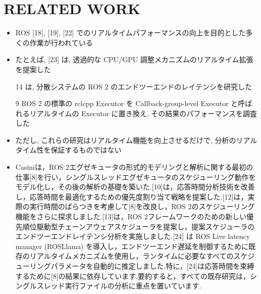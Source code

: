 
\section{RELATED WORK}
\label{sec: related work}


\begin{frame}{}
    \begin{itemize}
        \item ROS [18], [19], [22] でのリアルタイムパフォーマンスの向上を目的とした多くの作業が行われている
\item たとえば, [23] は, 透過的な CPU/GPU 調整メカニズムのリアルタイム拡張を提案した
\item [14] は, 分散システムの ROS 2 のエンドツーエンドのレイテンシを研究した
\item [9] ROS 2 の標準の rclcpp Executor を Callback-group-level Executor と呼ばれるリアルタイムの Executor に置き換え, その結果のパフォーマンスを調査した
\item ただし, これらの研究はリアルタイム機能を向上させるだけで, 分析のリアルタイム性を保証するものではない
    \end{itemize}
\end{frame}

\begin{frame}{}
    \begin{itemize}
        \item Casiniは，ROS 2エグゼキュータの形式的モデリングと解析に関する最初の仕事[8]を行い，シングルスレッドエグゼキュータのスケジューリング動作をモデル化し，その後の解析の基礎を築いた.[10]は，応答時間分析技術を改善し，応答時間を最適化するための優先度割り当て戦略を提案した.[12]は，実際の実行時間のばらつきを考慮して[8]を改良し，ROS 2のスケジューリング機能をさらに探求しました.[13]は，ROS 2フレームワークのための新しい優先順位駆動型チェーンアウェアスケジューラを提案し，提案スケジューラのエンドツーエンドレイテンシ分析を実施しました.[24] は ROS Live latency manager (ROSLlama) を導入し，エンドツーエンド遅延を制御するために既存のリアルタイムメカニズムを使用し，ランタイムに必要なすべてのスケジューリングパラメータを自動的に推定しました.特に，[24]は応答時間を束縛するために[8]の結果に依存しています.要約すると，すべての既存研究は，シングルスレッド実行ファイルの分析に重点を置いています.
    \end{itemize}
\end{frame}

